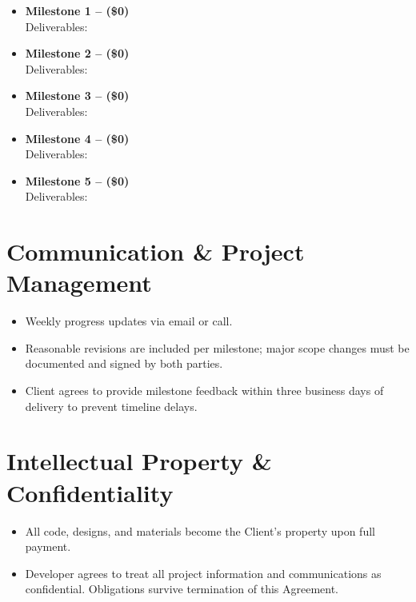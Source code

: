 \documentclass[11pt,letterpaper]{article}
\newcommand{\MilestoneOne}{}
\newcommand{\MOneCost}{0}
\newcommand{\MOneDeliverables}{}
\newcommand{\MilestoneTwo}{}
\newcommand{\MTwoCost}{0}
\newcommand{\MTwoDeliverables}{}
\newcommand{\MilestoneThree}{}
\newcommand{\MThreeCost}{0}
\newcommand{\MThreeDeliverables}{}
\newcommand{\MilestoneFour}{}
\newcommand{\MFourCost}{0}
\newcommand{\MFourDeliverables}{}
\newcommand{\MilestoneFive}{}
\newcommand{\MFiveCost}{0}
\newcommand{\MFiveDeliverables}{}
\begin{document}
\begin{itemize}[leftmargin=*]
\item \textbf{Milestone 1 -- \MilestoneOne{} (\$\MOneCost{})}\\
Deliverables: \MOneDeliverables{}

\item \textbf{Milestone 2 -- \MilestoneTwo{} (\$\MTwoCost{})}\\
Deliverables: \MTwoDeliverables{}

\item \textbf{Milestone 3 -- \MilestoneThree{} (\$\MThreeCost{})}\\
Deliverables: \MThreeDeliverables{}

\item \textbf{Milestone 4 -- \MilestoneFour{} (\$\MFourCost{})}\\
Deliverables: \MFourDeliverables{}

\item \textbf{Milestone 5 -- \MilestoneFive{} (\$\MFiveCost{})}\\
Deliverables: \MFiveDeliverables{}
\end{itemize}

\section{Communication \& Project Management}
\begin{itemize}[leftmargin=*]
\item Weekly progress updates via email or call.
\item Reasonable revisions are included per milestone; major scope changes must be documented and signed by both parties.
\item Client agrees to provide milestone feedback within three business days of delivery to prevent timeline delays.
\end{itemize}

\section{Intellectual Property \& Confidentiality}
\begin{itemize}[leftmargin=*]
\item All code, designs, and materials become the Client's property upon full payment.
\item Developer agrees to treat all project information and communications as confidential. Obligations survive termination of this Agreement.
\end{itemize}
\end{document}
